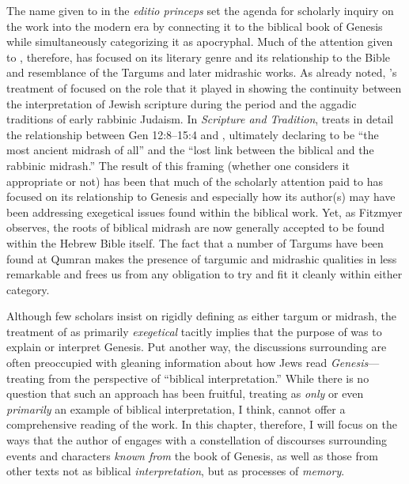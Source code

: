 The name given to \ga in the \emph{editio princeps} set the agenda for scholarly inquiry on the work into the modern era by connecting it to the biblical book of Genesis while simultaneously categorizing it as apocryphal. Much of the attention given to \ga, therefore, has focused on its literary genre and its relationship to the Bible and resemblance of the Targums and later midrashic works. As already noted, \vermes's treatment of \ga focused on the role that it played in showing the continuity between the interpretation of Jewish scripture during the \secondtemple period and the aggadic traditions of early rabbinic Judaism. In \emph{Scripture and Tradition}, \vermes treats in detail the relationship between Gen 12:8--15:4 and \ga {}, ultimately declaring \ga to be ``the most ancient midrash of all'' and the ``lost link between the biblical and the rabbinic midrash.''%
    \autocite[124]{vermes1961}
The result of this framing (whether one considers it appropriate or not) has been that much of the scholarly attention paid to \ga has focused on its relationship to Genesis and especially how its author(s) may have been addressing exegetical issues found within the biblical work. Yet, as Fitzmyer observes, the roots of biblical midrash are now generally accepted to be found within the Hebrew Bible itself.%
    \autocite[20]{fitzmyer2004}
The fact that a number of Targums have been found at Qumran makes the presence of targumic and midrashic qualities in \ga less remarkable and frees us from any obligation to try and fit it cleanly within either category.

Although few scholars insist on rigidly defining \ga as either targum or midrash, the treatment of \ga as primarily \emph{exegetical} tacitly implies that the purpose of \ga was to explain or interpret Genesis. Put another way, the discussions surrounding \ga are often preoccupied with gleaning information about how \secondtemple Jews read \emph{Genesis}---treating \ga from the perspective of ``biblical interpretation.'' While there is no question that such an approach has been fruitful, treating \ga as \emph{only} or even \emph{primarily} an example of biblical interpretation, I think, cannot offer a comprehensive reading of the work. In this chapter, therefore, I will focus on the ways that the author of \ga engages with a  constellation of discourses surrounding events and characters \emph{known from} the book of Genesis, as well as those from other texts not as biblical \emph{interpretation}, but as processes of \emph{memory}.

